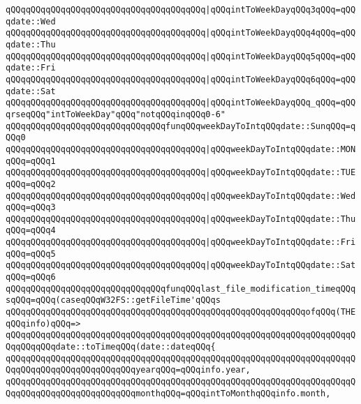 \verb|qQQqqQQqqQQqqQQqqQQqqQQqqQQqqQQqqQQqqQQq|\verb#|qQQqintToWeekDayqQQq3qQQq=qQQqdate::Wed#\newline
\verb|qQQqqQQqqQQqqQQqqQQqqQQqqQQqqQQqqQQqqQQq|\verb#|qQQqintToWeekDayqQQq4qQQq=qQQqdate::Thu#\newline
\verb|qQQqqQQqqQQqqQQqqQQqqQQqqQQqqQQqqQQqqQQq|\verb#|qQQqintToWeekDayqQQq5qQQq=qQQqdate::Fri#\newline
\verb|qQQqqQQqqQQqqQQqqQQqqQQqqQQqqQQqqQQqqQQq|\verb#|qQQqintToWeekDayqQQq6qQQq=qQQqdate::Sat#\newline
\verb|qQQqqQQqqQQqqQQqqQQqqQQqqQQqqQQqqQQqqQQq|\verb#|qQQqintToWeekDayqQQq_qQQq=qQQqrseqQQq"intToWeekDay"qQQq"notqQQqinqQQq0-6"#\newline
\newline
\verb|qQQqqQQqqQQqqQQqqQQqqQQqqQQqqQQqfunqQQqweekDayToIntqQQqdate::SunqQQq=qQQq0|\newline
\verb|qQQqqQQqqQQqqQQqqQQqqQQqqQQqqQQqqQQqqQQq|\verb#|qQQqweekDayToIntqQQqdate::MONqQQq=qQQq1#\newline
\verb|qQQqqQQqqQQqqQQqqQQqqQQqqQQqqQQqqQQqqQQq|\verb#|qQQqweekDayToIntqQQqdate::TUEqQQq=qQQq2#\newline
\verb|qQQqqQQqqQQqqQQqqQQqqQQqqQQqqQQqqQQqqQQq|\verb#|qQQqweekDayToIntqQQqdate::WedqQQq=qQQq3#\newline
\verb|qQQqqQQqqQQqqQQqqQQqqQQqqQQqqQQqqQQqqQQq|\verb#|qQQqweekDayToIntqQQqdate::ThuqQQq=qQQq4#\newline
\verb|qQQqqQQqqQQqqQQqqQQqqQQqqQQqqQQqqQQqqQQq|\verb#|qQQqweekDayToIntqQQqdate::FriqQQq=qQQq5#\newline
\verb|qQQqqQQqqQQqqQQqqQQqqQQqqQQqqQQqqQQqqQQq|\verb#|qQQqweekDayToIntqQQqdate::SatqQQq=qQQq6#\newline
\newline
\verb|qQQqqQQqqQQqqQQqqQQqqQQqqQQqqQQqfunqQQqlast_file_modification_timeqQQqsqQQq=qQQq(caseqQQqW32FS::getFileTime'qQQqs|\newline
\verb|qQQqqQQqqQQqqQQqqQQqqQQqqQQqqQQqqQQqqQQqqQQqqQQqqQQqqQQqqQQqofqQQq(THEqQQqinfo)qQQq=>|\newline
\verb|qQQqqQQqqQQqqQQqqQQqqQQqqQQqqQQqqQQqqQQqqQQqqQQqqQQqqQQqqQQqqQQqqQQqqQQqqQQqqQQqdate::toTimeqQQq(date::dateqQQq{|\newline
\verb|qQQqqQQqqQQqqQQqqQQqqQQqqQQqqQQqqQQqqQQqqQQqqQQqqQQqqQQqqQQqqQQqqQQqqQQqqQQqqQQqqQQqqQQqqQQqqQQqyearqQQq=qQQqinfo.year,|\newline
\verb|qQQqqQQqqQQqqQQqqQQqqQQqqQQqqQQqqQQqqQQqqQQqqQQqqQQqqQQqqQQqqQQqqQQqqQQqqQQqqQQqqQQqqQQqqQQqqQQqmonthqQQq=qQQqintToMonthqQQqinfo.month,|\newline
